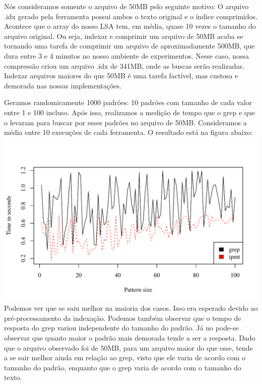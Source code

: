 Nós consideramos somente o arquivo de 50MB pelo seguinte motivo: O arquivo .idx
gerado pela ferramenta \ipmt possui ambos o texto original e o índice
comprimidos. Acontece que o array do nosso LSA tem, em média, quase 10 vezes o
tamanho do arquivo original. Ou seja, indexar e comprimir um arquivo de 50MB
acaba se tornando uma tarefa de comprimir um arquivo de aproximadamente 500MB,
que dura entre 3 e 4 minutos no nosso ambiente de experimentos. Nesse caso,
nossa compressão criou um arquivo .idx de 341MB, onde as buscas serão realizadas.
Indexar arquivos maiores do que 50MB é uma tarefa factível, mas
custosa e demorada nas nossas implementações.

Geramos randomicamente 1000 padrões: 10 padrões com tamanho de cada valor
entre 1 e 100 incluso. Após isso, realizamos a medição de tempo que o grep e
que o \ipmt levaram para buscar por esses padrões no arquivo de 50MB.
Consideramos a média entre 10 execuções de cada ferramenta. O
resultado está na figura abaixo:
\\
\includegraphics[scale=0.74]{../experiments/R/pdf/rq2}
\\

Podemos ver que \ipmt se saiu melhor na maioria dos casos. Isso era esperado
devido ao pré-processamento da indexação. Podemos também observar que
o tempo de resposta do grep variou independente do tamanho do padrão. Já no
\ipmt pode-se observar que quanto maior o padrão mais demorada tende a ser a
resposta. Dado que o arquivo observado foi de 50MB, para um arquivo maior do que
esse, \ipmt tende a se sair melhor ainda em relação ao grep, visto que ele varia
de acordo com o tamanho do padrão, enquanto que o grep varia de acordo com o
tamanho do texto.

